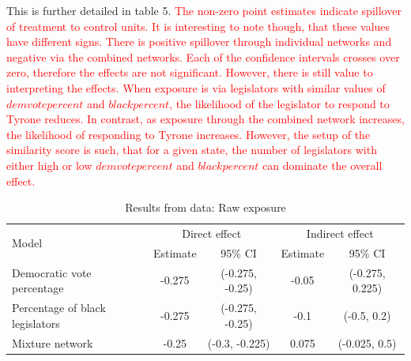 \documentclass[12pt]{article}
\begin{document}
This is further detailed in table 5. \textcolor{red}{The non-zero point estimates indicate spillover of treatment to control units. It is interesting to note though, that these values have different signs. There is positive spillover through individual networks and negative via the combined networks. Each of the confidence intervals crosses over zero, therefore the effects are not significant. However, there is still value to interpreting the effects. When exposure is via legislators with similar values of $demvotepercent$ and $blackpercent$, the likelihood of the legislator to respond to Tyrone reduces. In contrast, as exposure through the combined network increases, the likelihood of responding to Tyrone increases. However, the setup of the similarity score is such, that for a given state, the number of legislators with either high or low $demvotepercent$ and $blackpercent$ can dominate the overall effect.}


\begin{table}[h]
\centering
\begin{tabular}{lcccc}
\toprule
\multirow{2}{*}{Model} & \multicolumn{2}{c}{Direct effect} & \multicolumn{2}{c}{Indirect effect} \\
\cmidrule(l){2-3} \cmidrule(l){4-5}
 & Estimate & 95\% CI & Estimate & 95\% CI \\
\midrule
Democratic vote percentage & -0.275 & (-0.275, -0.25) &  -0.05 & (-0.275, 0.225)\\
Percentage of black legislators & -0.275 & (-0.275, -0.25) &  -0.1 & (-0.5, 0.2)\\
Mixture network & -0.25 & (-0.3, -0.225) &  0.075 & (-0.025, 0.5)\\
\bottomrule
\end{tabular}
\caption{Results from \citet{broockman2013black} data: Raw exposure}
\end{table}
\end{document}
